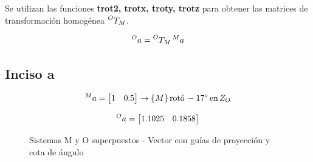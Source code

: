 \documentclass[a4paper,12pt]{article}
\begin{document}
Se utilizan las funciones \textbf{trot2, trotx, troty, trotz} para obtener las matrices de transformación
homogénea $\prescript{O}{}{T_M}$.

\begin{equation}
    \prescript{O}{}{a} = \prescript{O}{}{T_M}\prescript{M}{}{a}
    \label{transformacion}
\end{equation}


\subsection{Inciso a}
\begin{equation*}
    \prescript{M}{}{a} = 
    \begin{bmatrix}
        1 & 0.5
    \end{bmatrix}
    \rightarrow \{M\} \, \text{rotó} \,  -17^\circ \, \text{en}\, Z_O
\end{equation*}

\begin{equation*}
    \prescript{O}{}{a} = 
    \begin{bmatrix}
        1.1025 & 0.1858
    \end{bmatrix}
\end{equation*}

\begin{figure}[H]
    \centering
    \begin{adjustbox}{scale = 0.85, max width=\columnwidth}
    \end{adjustbox}
    \caption{Sistemas M y O superpuestos - Vector con guías de proyección y cota de ángulo}
\end{figure}
\end{document}
